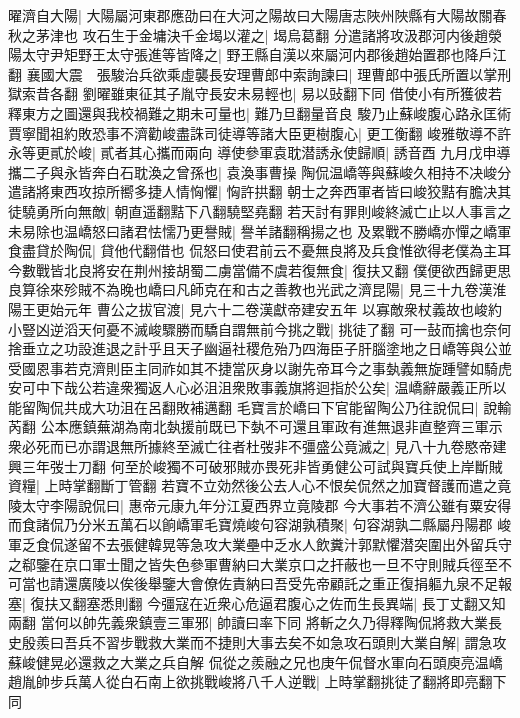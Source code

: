 曜濟自大陽|{
	大陽屬河東郡應劭曰在大河之陽故曰大陽唐志陜州陜縣有大陽故關春秋之茅津也}
攻石生于金墉決千金堨以灌之|{
	堨烏葛翻}
分遣諸將攻汲郡河内後趙滎陽太守尹矩野王太守張進等皆降之|{
	野王縣自漢以來屬河内郡後趙始置郡也降戶江翻}
襄國大震　張駿治兵欲乘虛襲長安理曹郎中索詢諫曰|{
	理曹郎中張氏所置以掌刑獄索昔各翻}
劉曜雖東征其子胤守長安未易輕也|{
	易以䜴翻下同}
借使小有所獲彼若釋東方之圖還與我校禍難之期未可量也|{
	難乃旦翻量音良}
駿乃止蘇峻腹心路永匡術賈寧聞祖約敗恐事不濟勸峻盡誅司徒導等諸大臣更樹腹心|{
	更工衡翻}
峻雅敬導不許永等更貳於峻|{
	貳者其心攜而兩向}
導使參軍袁耽潜誘永使歸順|{
	誘音酉}
九月戊申導攜二子與永皆奔白石耽渙之曾孫也|{
	袁渙事曹操}
陶侃温嶠等與蘇峻久相持不决峻分遣諸將東西攻掠所嚮多捷人情恟懼|{
	恟許拱翻}
朝士之奔西軍者皆曰峻狡黠有膽决其徒驍勇所向無敵|{
	朝直遥翻黠下八翻驍堅堯翻}
若天討有罪則峻終滅亡止以人事言之未易除也温嶠怒曰諸君怯懦乃更譽賊|{
	譽羊諸翻稱揚之也}
及累戰不勝嶠亦憚之嶠軍食盡貸於陶侃|{
	貸他代翻借也}
侃怒曰使君前云不憂無良將及兵食惟欲得老僕為主耳今數戰皆北良將安在荆州接胡蜀二虜當備不虞若復無食|{
	復扶又翻}
僕便欲西歸更思良算徐來殄賊不為晚也嶠曰凡師克在和古之善教也光武之濟昆陽|{
	見三十九卷漢淮陽王更始元年}
曹公之拔官渡|{
	見六十二卷漢獻帝建安五年}
以寡敵衆杖義故也峻約小豎凶逆滔天何憂不滅峻驟勝而驕自謂無前今挑之戰|{
	挑徒了翻}
可一鼔而擒也奈何捨垂立之功設進退之計乎且天子幽逼社稷危殆乃四海臣子肝腦塗地之日嶠等與公並受國恩事若克濟則臣主同祚如其不捷當灰身以謝先帝耳今之事埶義無旋踵譬如騎虎安可中下哉公若違衆獨返人心必沮沮衆敗事義旗將迴指於公矣|{
	温嶠辭嚴義正所以能留陶侃共成大功沮在呂翻敗補邁翻}
毛寶言於嶠曰下官能留陶公乃往說侃曰|{
	說輸芮翻}
公本應鎮蕪湖為南北埶援前既已下埶不可還且軍政有進無退非直整齊三軍示衆必死而已亦謂退無所據終至滅亡往者杜弢非不彊盛公竟滅之|{
	見八十九卷愍帝建興三年弢士刀翻}
何至於峻獨不可破邪賊亦畏死非皆勇健公可試與寶兵使上岸斷賊資糧|{
	上時掌翻斷丁管翻}
若寶不立効然後公去人心不恨矣侃然之加寶督護而遣之竟陵太守李陽說侃曰|{
	惠帝元康九年分江夏西界立竟陵郡}
今大事若不濟公雖有粟安得而食諸侃乃分米五萬石以餉嶠軍毛寶燒峻句容湖孰積聚|{
	句容湖孰二縣屬丹陽郡}
峻軍乏食侃遂留不去張健韓晃等急攻大業壘中乏水人飲糞汁郭默懼潜突圍出外留兵守之郗鑒在京口軍士聞之皆失色參軍曹納曰大業京口之扞蔽也一旦不守則賊兵徑至不可當也請還廣陵以俟後舉鑒大會僚佐責納曰吾受先帝顧託之重正復捐軀九泉不足報塞|{
	復扶又翻塞悉則翻}
今彊寇在近衆心危逼君腹心之佐而生長異端|{
	長丁丈翻又知兩翻}
當何以帥先義衆鎮壹三軍邪|{
	帥讀曰率下同}
將斬之久乃得釋陶侃將救大業長史殷羨曰吾兵不習步戰救大業而不捷則大事去矣不如急攻石頭則大業自解|{
	謂急攻蘇峻健晃必還救之大業之兵自解}
侃從之羨融之兄也庚午侃督水軍向石頭庾亮温嶠趙胤帥步兵萬人從白石南上欲挑戰峻將八千人逆戰|{
	上時掌翻挑徒了翻將即亮翻下同}
